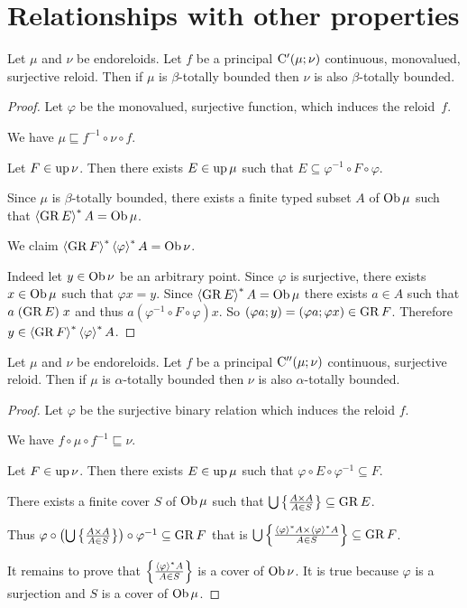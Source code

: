 \section{Relationships with other properties}
\begin{thm}
Let $\mu$ and $\nu$ be endoreloids. Let $f$ be a principal $\mathrm{C}'(\mu;\nu)$
continuous, monovalued, surjective reloid. Then if $\mu$ is $\beta$-totally
bounded then $\nu$ is also $\beta$-totally bounded.\end{thm}
\begin{proof}
Let $\varphi$ be the monovalued, surjective function, which induces
the reloid~$f$.

We have $\mu\sqsubseteq f^{-1}\circ\nu\circ f$.

Let $F\in\operatorname{up}\nu$. Then there exists $E\in\operatorname{up}\mu$ such that $E\subseteq\varphi^{-1}\circ F\circ\varphi$.

Since $\mu$ is $\beta$-totally bounded, there exists a finite typed
subset $A$ of $\operatorname{Ob}\mu$ such that $\left\langle \operatorname{GR} E\right\rangle ^{\ast}A=\operatorname{Ob}\mu$.

We claim $\left\langle \operatorname{GR} F\right\rangle ^{\ast}\left\langle \varphi\right\rangle ^{\ast}A=\operatorname{Ob}\nu$.

Indeed let $y\in\operatorname{Ob}\nu$ be an arbitrary point. Since $\varphi$ is
surjective, there exists $x\in\operatorname{Ob}\mu$ such that $\varphi x=y$. Since
$\left\langle \operatorname{GR} E\right\rangle ^{\ast}A=\operatorname{Ob}\mu$ there exists $a\in A$ such that $a\mathrel{(\operatorname{GR} E)}x$
and thus $a\mathrel{(\varphi^{-1}\circ F\circ\varphi)}x$. So $(\varphi a;y)=(\varphi a;\varphi x)\in\operatorname{GR} F$.
Therefore $y\in\left\langle \operatorname{GR} F\right\rangle ^{\ast}\left\langle \varphi\right\rangle ^{\ast}A$.\end{proof}
\begin{thm}
Let $\mu$ and $\nu$ be endoreloids. Let $f$ be a principal $\mathrm{C}''(\mu;\nu)$
continuous, surjective reloid. Then if $\mu$ is $\alpha$-totally
bounded then $\nu$ is also $\alpha$-totally bounded.\end{thm}
\begin{proof}
Let $\varphi$ be the surjective binary relation which induces the
reloid $f$.

We have $f\circ\mu\circ f^{-1}\sqsubseteq\nu$.

Let $F\in\operatorname{up}\nu$. Then there exists $E\in\operatorname{up}\mu$ such that $\varphi\circ E\circ\varphi^{-1}\subseteq F$.

There exists a finite cover $S$ of $\operatorname{Ob}\mu$ such that $\bigcup\left\{ \frac{A\times A}{A\in S}\right\}\subseteq\operatorname{GR} E$.

Thus $\varphi\circ\left(\bigcup\left\{ \frac{A\times A}{A\in S}\right\}\right)\circ\varphi^{-1}\subseteq\operatorname{GR} F$
that is $\bigcup\left\{ \frac{\left\langle \varphi\right\rangle ^{\ast}A\times\left\langle \varphi\right\rangle ^{\ast}A}{A\in S}\right\}\subseteq\operatorname{GR} F$.

It remains to prove that $\left\{ \frac{\left\langle \varphi\right\rangle ^{\ast}A}{A\in S}\right\}$ is
a cover of $\operatorname{Ob}\nu$. It is true because $\varphi$ is a surjection
and $S$ is a cover of $\operatorname{Ob}\mu$.
\end{proof}

